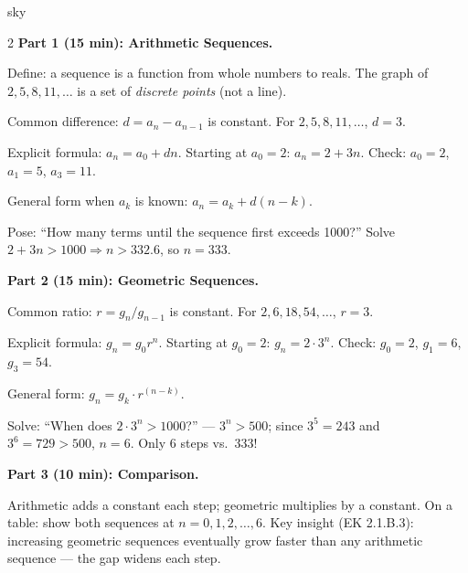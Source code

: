 \documentclass[10pt]{article}
\begin{document}
\begin{skillbox}[Lesson]{sky}
\begin{multicols}{2}
\textbf{Part 1 (15 min): Arithmetic Sequences.}

Define: a sequence is a function from whole numbers to reals. The graph of
$2, 5, 8, 11, \ldots$ is a set of \textit{discrete points} (not a line).

Common difference: $d = a_n - a_{n-1}$ is constant. For $2, 5, 8, 11, \ldots$, $d = 3$.

Explicit formula: $a_n = a_0 + dn$. Starting at $a_0 = 2$:
$a_n = 2 + 3n$.
Check: $a_0 = 2$, $a_1 = 5$, $a_3 = 11$. \checkmark

General form when $a_k$ is known: $a_n = a_k + d(n - k)$.

Pose: ``How many terms until the sequence first exceeds 1000?''
Solve $2 + 3n > 1000 \Rightarrow n > 332.6$, so $n = 333$.

\columnbreak

\textbf{Part 2 (15 min): Geometric Sequences.}

Common ratio: $r = g_n / g_{n-1}$ is constant. For $2, 6, 18, 54, \ldots$, $r = 3$.

Explicit formula: $g_n = g_0 r^n$. Starting at $g_0 = 2$:
$g_n = 2 \cdot 3^n$.
Check: $g_0 = 2$, $g_1 = 6$, $g_3 = 54$. \checkmark

General form: $g_n = g_k \cdot r^{(n-k)}$.

Solve: ``When does $2 \cdot 3^n > 1000$?'' --- $3^n > 500$; since $3^5 = 243$
and $3^6 = 729 > 500$, $n = 6$. Only 6 steps vs.\ 333!

\textbf{Part 3 (10 min): Comparison.}

Arithmetic adds a constant each step; geometric multiplies by a constant.
On a table: show both sequences at $n = 0, 1, 2, \ldots, 6$.
Key insight (EK 2.1.B.3): increasing geometric sequences eventually grow
faster than any arithmetic sequence --- the gap widens each step.
\end{multicols}
\end{skillbox}
\end{document}
